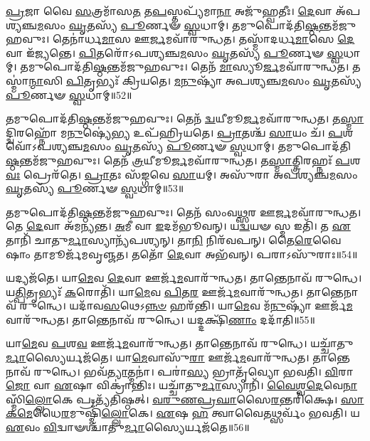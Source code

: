 \-\ul{𑌪𑍍𑌰}\-𑌜𑌾 𑌵𑍈 \ul{𑌸}\-𑌤𑍍𑌰𑌮𑌾᳴𑌸\-\ul{𑌤} 𑌤\-\ul{𑌪}\-𑌸𑍍𑌤𑌪𑍍𑌯᳴𑌮𑌾\-\ul{𑌨𑌾} 𑌅𑌜𑍁᳴𑌹𑍍𑌵𑌤𑍀𑌃।
\-\ul{𑌦𑍇}\-𑌵𑌾 𑌅᳴𑌪𑌶𑍍𑌯𑌞𑍍𑌚\-\ul{𑌮}\-𑌸𑌂 \ul{𑌘𑍃}\-𑌤𑌸𑍍𑌯᳴ \ul{𑌪𑍂}\-𑌰𑍍𑌣𑍟 \ul{𑌸𑍍𑌵}\-𑌧𑌾𑌮𑍍।
𑌤𑌮𑍁𑌪𑍋𑌦᳴𑌤𑌿\-\ul{𑌷𑍍𑌠}\-𑌨𑍍𑌤𑌮᳴\-𑌜𑍁𑌹𑌵𑍁𑌃।
𑌤𑍇𑌨𑌾॑𑌰𑍍𑌧\-\ul{𑌮𑌾}\-𑌸 𑌊\-\ul{𑌰𑍍𑌜}\-𑌮𑌵𑌾᳴𑌰𑍁𑌨𑍍𑌧𑌤।
𑌤𑌸𑍍𑌮𑌾᳴𑌦𑌰𑍍𑌧\-\ul{𑌮𑌾}\-𑌸𑍇 \ul{𑌦𑍇}\-𑌵𑌾 𑌇᳴𑌜𑍍𑌯𑌨𑍍𑌤𑍇।
\-\ul{𑌪𑌿}\-𑌤𑌰𑍋᳴\-𑌽𑌪𑌶𑍍𑌯𑌞𑍍𑌚\-\ul{𑌮}\-𑌸𑌂 \ul{𑌘𑍃}\-𑌤𑌸𑍍𑌯᳴ \ul{𑌪𑍂}\-𑌰𑍍𑌣𑍟 \ul{𑌸𑍍𑌵}\-𑌧𑌾𑌮𑍍।
𑌤𑌮𑍁𑌪𑍋𑌦᳴𑌤𑌿\-\ul{𑌷𑍍𑌠}\-𑌨𑍍𑌤𑌮᳴𑌜𑍁𑌹𑌵𑍁𑌃।
𑌤𑍇𑌨᳴ \ul{𑌮𑌾}\-𑌸𑍍𑌯𑍂\-\ul{𑌰𑍍𑌜}\-𑌮𑌵𑌾᳴𑌰𑍁𑌨𑍍𑌧𑌤।
𑌤𑌸𑍍𑌮𑌾॑\-\ul{𑌨𑍍𑌮𑌾}\-𑌸𑌿 \ul{𑌪𑌿}\-𑌤𑍃𑌭𑍍𑌯𑌃᳴ 𑌕𑍍𑌰𑌿𑌯𑌤𑍇।
\-\ul{𑌮}\-\-\ul{𑌨𑍁}\-𑌷𑍍𑌯𑌾᳴ 𑌅𑌪𑌶𑍍𑌯𑌞𑍍𑌚\-\ul{𑌮}\-𑌸𑌂 \ul{𑌘𑍃}\-𑌤𑌸𑍍𑌯᳴ \ul{𑌪𑍂}\-𑌰𑍍𑌣𑍟 \ul{𑌸𑍍𑌵}\-𑌧𑌾𑌮𑍍॥52॥

𑌤𑌮𑍁𑌪𑍋𑌦᳴𑌤𑌿\-\ul{𑌷𑍍𑌠}\-𑌨𑍍𑌤𑌮᳴𑌜𑍁𑌹𑌵𑍁𑌃।
𑌤𑍇𑌨᳴ \ul{𑌦𑍍𑌵}\-𑌯𑍀𑌮𑍂\-\ul{𑌰𑍍𑌜}\-𑌮𑌵𑌾᳴𑌰𑍁𑌨𑍍𑌧𑌤।
𑌤\-\ul{𑌸𑍍𑌮𑌾}\-𑌦𑍍𑌦𑍍𑌵𑌿𑌰𑌹𑍍𑌨𑍋᳴ 𑌮\-\ul{𑌨𑍁}\-𑌷𑍍𑌯𑍇॑\-\ul{𑌭𑍍𑌯} 𑌉𑌪᳴𑌹𑍍𑌰𑌿𑌯𑌤𑍇।
\-\ul{𑌪𑍍𑌰𑌾}\-𑌤𑌶𑍍𑌚᳴ \ul{𑌸𑌾}\-𑌯𑌂 𑌚᳴।
\-\ul{𑌪}\-𑌶𑌵𑍋᳴\-𑌽𑌪𑌶𑍍𑌯𑌞𑍍𑌚\-\ul{𑌮}\-𑌸𑌂 \ul{𑌘𑍃}\-𑌤𑌸𑍍𑌯᳴ \ul{𑌪𑍂}\-𑌰𑍍𑌣𑍟 \ul{𑌸𑍍𑌵}\-𑌧𑌾𑌮𑍍।
𑌤𑌮𑍁𑌪𑍋𑌦᳴𑌤𑌿\-\ul{𑌷𑍍𑌠}\-𑌨𑍍𑌤\-𑌮᳴𑌜𑍁𑌹𑌵𑍁𑌃।
𑌤𑍇𑌨᳴ \ul{𑌤𑍍𑌰}\-𑌯𑍀𑌮𑍂\-\ul{𑌰𑍍𑌜}\-𑌮𑌵𑌾᳴𑌰𑍁𑌨𑍍𑌧𑌤।
𑌤\-\ul{𑌸𑍍𑌮𑌾}\-𑌤𑍍𑌤𑍍𑌰𑌿𑌰𑌹𑍍𑌨𑌃᳴ \ul{𑌪}\-𑌶\-\ul{𑌵𑌃} 𑌪𑍍𑌰𑍇𑌰᳴𑌤𑍇।
\-\ul{𑌪𑍍𑌰𑌾}\-𑌤𑌃 𑌸᳴\-\ul{𑌙𑍍𑌗}\-𑌵𑍇 \ul{𑌸𑌾}\-𑌯𑌮𑍍।
𑌅𑌸𑍁᳴𑌰𑌾 𑌅𑌪𑌶𑍍𑌯𑌞𑍍𑌚\-\ul{𑌮}\-𑌸𑌂 \ul{𑌘𑍃}\-𑌤𑌸𑍍𑌯᳴ \ul{𑌪𑍂}\-𑌰𑍍𑌣𑍟 \ul{𑌸𑍍𑌵}\-𑌧𑌾𑌮𑍍॥53॥

𑌤𑌮𑍁𑌪𑍋𑌦᳴𑌤𑌿\-\ul{𑌷𑍍𑌠}\-𑌨𑍍𑌤𑌮᳴𑌜𑍁𑌹𑌵𑍁𑌃।
𑌤𑍇𑌨᳴ 𑌸𑌂𑌵\-\ul{𑌥𑍍𑌸}\-𑌰 𑌊\-\ul{𑌰𑍍𑌜}\-𑌮𑌵𑌾᳴𑌰𑍁𑌨𑍍𑌧𑌤।
𑌤𑍇 \ul{𑌦𑍇}\-𑌵𑌾 𑌅᳴𑌮𑌨𑍍𑌯𑌨𑍍𑌤।
\-\ul{𑌅}\-𑌮𑍀 𑌵𑌾 \ul{𑌇}\-𑌦𑌮᳴𑌭𑍂𑌵𑌨𑍍।
𑌯\-\ul{𑌦𑍍𑌵}\-𑌯𑍟 𑌸𑍍𑌮 𑌇𑌤𑌿᳴।
𑌤 \ul{𑌏}\-𑌤𑌾𑌨𑌿᳴ 𑌚𑌾𑌤𑍁\-\ul{𑌰𑍍𑌮𑌾}\-𑌸𑍍𑌯𑌾𑌨𑍍𑌯᳴𑌪𑌶𑍍𑌯𑌨𑍍।
𑌤𑌾\-\ul{𑌨𑌿} 𑌨𑌿𑌰᳴𑌵𑌪𑌨𑍍।
𑌤𑍈\-\ul{𑌰𑍇}\-𑌵𑍈𑌷𑌾𑌂 𑌤𑌾𑌮𑍂𑌰𑍍𑌜᳴𑌮𑌵𑍃𑌞𑍍𑌜𑌤।
𑌤𑌤𑍋᳴ \ul{𑌦𑍇}\-𑌵𑌾 𑌅𑌭᳴𑌵𑌨𑍍।
𑌪𑌰𑌾𑌽𑌸𑍁᳴𑌰𑌾𑌃॥54॥

𑌯𑌦𑍍𑌯𑌜᳴𑌤𑍇।
𑌯𑌾\-\ul{𑌮𑍇}\-𑌵 \ul{𑌦𑍇}\-𑌵𑌾 𑌊𑌰𑍍𑌜᳴\-\ul{𑌮}\-𑌵𑌾𑌰𑍁᳴𑌨𑍍𑌧𑌤।
𑌤𑌾𑌨𑍍𑌤𑍇𑌨𑌾𑌵᳴ 𑌰𑍁𑌨𑍍𑌧𑍇।
𑌯\-\ul{𑌤𑍍𑌪𑌿}\-𑌤𑍃𑌭𑍍𑌯𑌃᳴ \ul{𑌕}\-𑌰𑍋𑌤𑌿᳴।
𑌯𑌾\-\ul{𑌮𑍇}\-𑌵 \ul{𑌪𑌿}\-𑌤\-\ul{𑌰} 𑌊𑌰𑍍𑌜᳴\-\ul{𑌮}\-𑌵𑌾𑌰𑍁᳴𑌨𑍍𑌧𑌤।
𑌤𑌾𑌨𑍍𑌤𑍇𑌨𑌾𑌵᳴ 𑌰𑍁𑌨𑍍𑌧𑍇।
𑌯𑌦𑌾᳴𑌵\-\ul{𑌸}\-𑌥𑍇\-𑌽\-\ul{𑌨𑍍𑌨}\-\-\ul{𑍞} 𑌹𑌰᳴𑌨𑍍𑌤𑌿।
𑌯𑌾\-\ul{𑌮𑍇}\-𑌵 𑌮᳴\-\ul{𑌨𑍁}\-𑌷𑍍𑌯𑌾᳴ 𑌊𑌰𑍍𑌜᳴\-\ul{𑌮}\-𑌵𑌾𑌰𑍁᳴𑌨𑍍𑌧𑌤।
𑌤𑌾𑌨𑍍𑌤𑍇𑌨𑌾𑌵᳴ 𑌰𑍁𑌨𑍍𑌧𑍇।
𑌯𑌦𑍍𑌦𑌕𑍍𑌷𑌿᳴\-\ul{𑌣𑌾𑌂} 𑌦𑌦𑌾᳴𑌤𑌿॥55॥

𑌯𑌾\-\ul{𑌮𑍇}\-𑌵 \ul{𑌪}\-𑌶\-\ul{𑌵} 𑌊𑌰𑍍𑌜᳴\-\ul{𑌮}\-𑌵𑌾𑌰𑍁᳴𑌨𑍍𑌧𑌤।
𑌤𑌾𑌨𑍍𑌤𑍇𑌨𑌾𑌵᳴ 𑌰𑍁𑌨𑍍𑌧𑍇।
𑌯𑌚𑍍𑌚𑌾᳴𑌤𑍁\-\ul{𑌰𑍍𑌮𑌾}\-𑌸𑍍𑌯𑍈𑌰𑍍\-𑌯𑌜᳴𑌤𑍇।
𑌯𑌾\-\ul{𑌮𑍇}\-𑌵𑌾𑌸𑍁᳴\-\ul{𑌰𑌾} 𑌊𑌰𑍍𑌜᳴\-\ul{𑌮}\-𑌵𑌾𑌰𑍁᳴𑌨𑍍𑌧𑌤।
𑌤𑌾𑌨𑍍𑌤𑍇𑌨𑌾𑌵᳴ 𑌰𑍁𑌨𑍍𑌧𑍇।
𑌭𑌵᳴\-\ul{𑌤𑍍𑌯𑌾}\-𑌤𑍍𑌮𑌨𑌾॑।
𑌪𑌰𑌾॑\-\ul{𑌸𑍍𑌯} 𑌭𑍍𑌰𑌾𑌤𑍃᳴𑌵𑍍𑌯𑍋 𑌭𑌵𑌤𑌿।
\-\ul{𑌵𑌿}\-𑌰𑌾\-\ul{𑌜𑍋} 𑌵𑌾 \ul{𑌏}\-𑌷𑌾 𑌵𑌿𑌕𑍍𑌰𑌾॑𑌨𑍍𑌤𑌿𑌃।
𑌯𑌚𑍍𑌚𑌾᳴𑌤𑍁\-\ul{𑌰𑍍𑌮𑌾}\-𑌸𑍍𑌯𑌾𑌨𑌿᳴।
\-\ul{𑌵𑍈}\-\-\ul{𑌶𑍍𑌵}\-\-\ul{𑌦𑍇}\-𑌵𑍇\-\ul{𑌨𑌾}\-𑌸𑍍𑌮𑌿𑌁\-\ul{𑌲𑍍𑌲𑍋}\-𑌕𑍇 𑌪𑍍𑌰𑌤𑍍𑌯᳴𑌤𑌿𑌷𑍍𑌠𑌤𑍍।
\-\ul{𑌵}\-\-\ul{𑌰𑍁}\-\-\ul{𑌣}\-\-\ul{𑌪𑍍𑌰}\-\-\ul{𑌘𑌾}\-𑌸𑍈\-\ul{𑌰}\-𑌨𑍍𑌤𑌰𑌿᳴𑌕𑍍𑌷𑍇।
\-\ul{𑌸𑌾}\-\-\ul{𑌕}\-\-\ul{𑌮𑍇}\-𑌧𑍈\-\ul{𑌰}\-𑌮𑍁𑌷𑍍𑌮𑌿𑌁᳴\-\ul{𑌲𑍍𑌲𑍋}\-𑌕𑍇।
\-\ul{𑌏}\-𑌷 \ul{𑌹} 𑌤𑍍𑌵𑌾𑌵𑍈𑌤𑌥𑍍𑌸𑌰𑍍𑌵𑌂᳴ 𑌭𑌵𑌤𑌿।
𑌯 \ul{𑌏}\-𑌵𑌂 \ul{𑌵𑌿}\-𑌦𑍍𑌵𑌾𑍟𑌶𑍍𑌚𑌾᳴𑌤𑍁\-\ul{𑌰𑍍𑌮𑌾}\-𑌸𑍍𑌯𑍈𑌰𑍍𑌯𑌜᳴𑌤𑍇॥56॥

